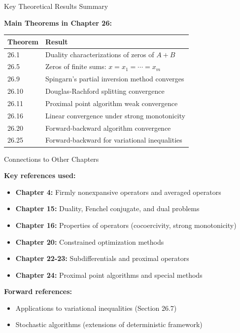 \documentclass[aspectratio=169,10pt]{beamer}
\begin{document}
\begin{frame}{Key Theoretical Results Summary}

\textbf{Main Theorems in Chapter 26:}

\begin{center}
  \begin{tabular}{p{3cm}|p{6cm}}
    \hline
    \textbf{Theorem} & \textbf{Result} \\
    \hline
    26.1 & Duality characterizations of zeros of $A + B$ \\
    \hline
    26.5 & Zeros of finite sums: $x = x_1 = \cdots = x_m$ \\
    \hline
    26.9 & Spingarn's partial inversion method converges \\
    \hline
    26.10 & Douglas-Rachford splitting convergence \\
    \hline
    26.11 & Proximal point algorithm weak convergence \\
    \hline
    26.16 & Linear convergence under strong monotonicity \\
    \hline
    26.20 & Forward-backward algorithm convergence \\
    \hline
    26.25 & Forward-backward for variational inequalities \\
    \hline
  \end{tabular}
\end{center}

\end{frame}

\begin{frame}{Connections to Other Chapters}

\textbf{Key references used:}
\begin{itemize}
  \item \textbf{Chapter 4:} Firmly nonexpansive operators and averaged operators
  \item \textbf{Chapter 15:} Duality, Fenchel conjugate, and dual problems
  \item \textbf{Chapter 16:} Properties of operators (cocoercivity, strong monotonicity)
  \item \textbf{Chapter 20:} Constrained optimization methods
  \item \textbf{Chapter 22-23:} Subdifferentials and proximal operators
  \item \textbf{Chapter 24:} Proximal point algorithms and special methods
\end{itemize}

\vspace{0.3cm}
\textbf{Forward references:}
\begin{itemize}
  \item Applications to variational inequalities (Section 26.7)
  \item Stochastic algorithms (extensions of deterministic framework)
\end{itemize}

\end{frame}
\end{document}
